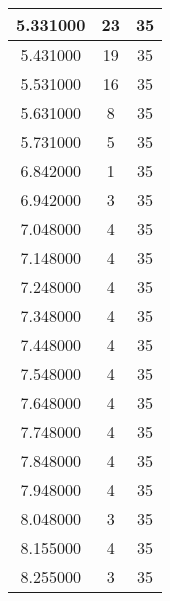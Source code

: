 \begin{longtable}[htbp]{|c|c|c|}
5.331000 & 23 & 35 \\ \hline
5.431000 & 19 & 35 \\ \hline
5.531000 & 16 & 35 \\ \hline
5.631000 & 8 & 35 \\ \hline
5.731000 & 5 & 35 \\ \hline
6.842000 & 1 & 35 \\ \hline
6.942000 & 3 & 35 \\ \hline
7.048000 & 4 & 35 \\ \hline
7.148000 & 4 & 35 \\ \hline
7.248000 & 4 & 35 \\ \hline
7.348000 & 4 & 35 \\ \hline
7.448000 & 4 & 35 \\ \hline
7.548000 & 4 & 35 \\ \hline
7.648000 & 4 & 35 \\ \hline
7.748000 & 4 & 35 \\ \hline
7.848000 & 4 & 35 \\ \hline
7.948000 & 4 & 35 \\ \hline
8.048000 & 3 & 35 \\ \hline
8.155000 & 4 & 35 \\ \hline
8.255000 & 3 & 35 \\ \hline
\end{longtable}
